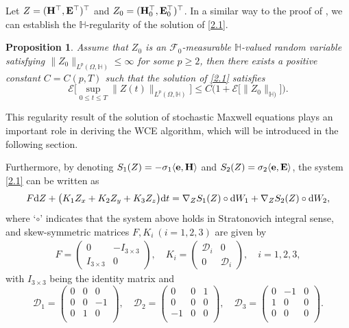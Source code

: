 \documentclass[preprint,12pt]{article}
\newtheorem{prop}{Proposition}[section]
\numberwithin{figure}{section}
\numberwithin{table}{section}
\numberwithin{equation}{section}
\begin{document}
Let $Z=({\bf H}^\top,{\bf E}^\top)^\top$ and $Z_0=({\bf H}_0^\top,{\bf E}_0^\top)^\top$. In a similar way to the proof of \cite[Theorem 2.4]{RefCHJ2023}, we can establish the $\mathbb{H}$-regularity of the solution of \eqref{2.1}.
\begin{prop}\label{prop2.1}
Assume that $Z_0$ is an $\mathcal{F}_0$-measurable $\mathbb{H}$-valued random variable satisfying $\|Z_0\|_{L^p(\Omega,\mathbb{H})}\leq\infty$ for some $p\geq2$, then there exists a positive constant $C=C(p,T)$ such that the solution of \eqref{2.1} satisfies
	$$\mathcal{E}\Big[\sup_{0\leq t\leq T}\|Z(t)\|_{L^p(\Omega,\mathbb{H})}\Big]\leq C\Big(1+\mathcal{E}\big[\|Z_0\|_{\mathbb{H})}\big]\Big).$$
\end{prop}
This regularity result of the solution of stochastic Maxwell equations plays an important role in deriving the WCE algorithm, which will be introduced in the following section.

Furthermore, by denoting $S_{1}(Z)=-\sigma_{1}\langle{\bf e},{\bf H}\rangle$ and $S_{2}(Z)=\sigma_{2}\langle{\bf e},{\bf E}\rangle$, the system \eqref{2.1} can be written as
\begin{equation}\label{2.1.1}
	F{\rm d}Z+\big(K_1Z_{x}+K_2Z_{y}+K_3Z_{z}\big){\rm d}t=\nabla_Z S_{1}(Z)\circ{\rm d}W_{1}+\nabla_Z S_{2}(Z)\circ{\rm d}W_{2},
\end{equation}
where `$\circ$' indicates that the system above holds in Stratonovich integral sense, and skew-symmetric matrices $F,K_i~(i=1,2,3)$ are given by
\begin{align*}
	F=\left(\begin{array}{ccc}
		0&-I_{3\times3}\\
		I_{3\times3}&0
	\end{array}\right),\quad
	K_{i}=\left(\begin{array}{ccc}
		\mathcal{D}_i&0\\
		0&\mathcal{D}_i
	\end{array}\right),\quad i=1,2,3,
\end{align*}
with $I_{3\times3}$ being the identity matrix and
\begin{equation*}
	\mathcal{D}_{1}=\left(\begin{array}{ccccccc}
		0&0&0\\[1mm]
		0&0&-1\\[1mm]
		0&1&0\\[1mm]
	\end{array}\right),\quad
	\mathcal{D}_{2}=\left(\begin{array}{ccccccc}
		0&0&1\\[1mm]
		0&0&0\\[1mm]
		-1&0&0\\[1mm]
	\end{array}\right),\quad
	\mathcal{D}_{3}=\left(\begin{array}{ccccccc}
		0&-1&0\\[1mm]
		1&0&0\\[1mm]
		0&0&0\\[1mm]
	\end{array}\right).
\end{equation*}
\end{document}
